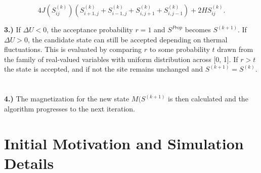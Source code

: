 \documentclass{article}
\begin{document}
\begin{equation}
4J (S^{(k)}_{ij})(S^{(k)}_{i+1, j} + S^{(k)}_{i-1, j} + S^{(k)}_{i,j+1} + S^{(k)}_{i,j-1}) + 2HS^{(k)}_{ij}.
\end{equation}

\noindent
\textbf{3.)} If $\Delta U < 0$, the acceptance probability $r =1$ and $S^{Prop}$ becomes $S^{(k+1)}.$ If $\Delta U > 0$, the candidate state can still be accepted depending on thermal fluctuations. This is evaluated by comparing $r$ to some probability $t$ drawn from the family of real-valued variables with uniform distribution across [0, 1]. If $r > t$ the state is accepted, and if not the site remains unchanged and $S^{(k+1)} = S^{(k)}$.
\paragraph{} \hspace{0pt} \\
\noindent
\textbf{4.)} The magnetization for the new state $M(S^{(k+1)}$ is then calculated and the algorithm progresses to the next iteration.


\section{Initial Motivation and Simulation Details}
\end{document}
